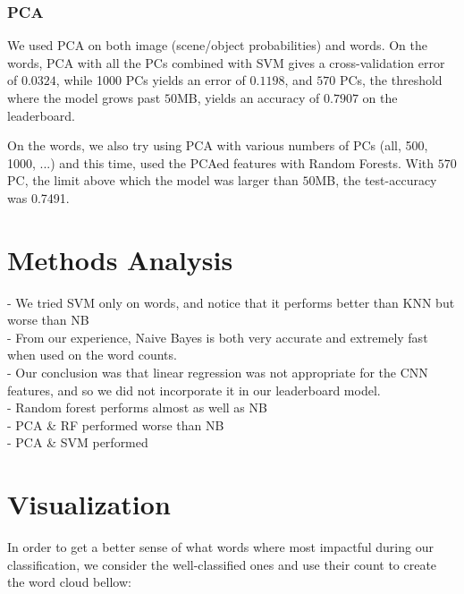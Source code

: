\documentclass[11pt,twocolumn]{report}
\begin{document}
    \subsubsection*{PCA}
    We used PCA on both image (scene/object probabilities) and words. On the words, PCA with all the PCs combined with SVM gives a cross-validation error of $0.0324$, while 1000 PCs yields an error of $0.1198$, and $570$ PCs, the threshold where the model grows past $50$MB, yields an accuracy of $0.7907$ on the leaderboard.
    \par
   On the words, we also try using PCA with various numbers of PCs (all, 500, 1000, ...) and this time, used the PCAed features with Random Forests. With $570$ PC, the limit above which the model was larger than $50$MB, the test-accuracy was 0.7491.\\

\section *{Methods Analysis}

    - We tried SVM only on words, and notice that it performs better than KNN but worse than NB \\
    - From our experience, Naive Bayes is both very accurate and extremely fast when used on the word counts. \\
    - Our conclusion was that linear regression was not appropriate for the CNN features, and so we did not incorporate it in our leaderboard model. \\
    - Random forest performs almost as well as NB \\
    - PCA \& RF performed worse than NB \\
    - PCA \& SVM performed 

\section*{Visualization}
    In order to get a better sense of what words where most impactful during our classification, we consider the well-classified ones and use their count to create the word cloud bellow:
    
\end{document}
